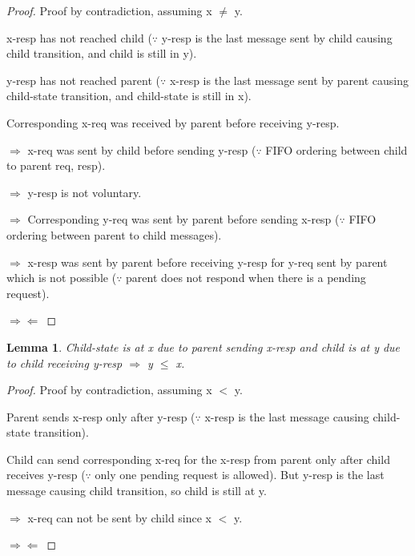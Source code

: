 \documentclass{article}
\newtheorem{lemma}{Lemma}
\begin{document}
\begin{proof}
Proof by contradiction, assuming x $\neq$ y.

\begin{figure}
\centering
\end{figure}

x-resp has not reached child ($\because$ y-resp is the last message sent by child causing child transition, and child is still in y).

y-resp has not reached parent ($\because$ x-resp is the last message sent by parent causing child-state transition, and child-state is still in x).

Corresponding x-req was received by parent before receiving y-resp.

$\Rightarrow$ x-req was sent by child before sending y-resp ($\because$ FIFO ordering between child to parent req, resp).

$\Rightarrow$ y-resp is not voluntary.

$\Rightarrow$ Corresponding y-req was sent by parent before sending x-resp ($\because$ FIFO ordering between parent to child messages).

$\Rightarrow$ x-resp was sent by parent before receiving y-resp for y-req sent by parent which is not possible ($\because$ parent does not respond when there is a pending request).

\begin{figure}
\centering
\end{figure}

$\Rightarrow \Leftarrow$

\end{proof}

\begin{lemma}
Child-state is at x due to parent sending x-resp and child is at y due to child receiving y-resp $\Rightarrow$ y $\le$ x.
\label{CRecvPSend<=}
\end{lemma}

\begin{proof}
Proof by contradiction, assuming x $<$ y.

\begin{figure}
\centering
\end{figure}

Parent sends x-resp only after y-resp ($\because$ x-resp is the last message causing child-state transition).

Child can send corresponding x-req for the x-resp from parent only after child receives y-resp ($\because$ only one pending request is allowed). But y-resp is the last message causing child transition, so child is still at y.

$\Rightarrow$ x-req can not be sent by child since x $<$ y.

$\Rightarrow \Leftarrow$

\end{proof}
\end{document}
